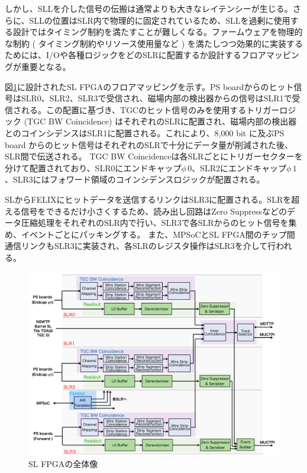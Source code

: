 しかし、SLLを介した信号の伝搬は通常よりも大きなレイテンシーが生じる。さらに、SLLの位置はSLR内で物理的に固定されているため、SLLを過剰に使用する設計ではタイミング制約を満たすことが難しくなる。ファームウェアを物理的な制約 ( タイミング制約やリソース使用量など ) を満たしつつ効果的に実装するためには、I/Oや各種ロジックをどのSLRに配置するか設計するフロアマッピングが重要となる。

図\ref{SL_floor}に設計されたSL FPGAのフロアマッピングを示す。PS boardからのヒット信号はSLR0、SLR2、SLR3で受信され、磁場内部の検出器からの信号はSLR1で受信される。この配置に基づき、TGCのヒット信号のみを使用するトリガーロジック (TGC BW Coincidence) はそれぞれのSLRに配置され、磁場内部の検出器とのコインシデンスはSLR1に配置される。これにより、8,000 bit に及ぶPS board からのヒット信号はそれぞれのSLRで十分にデータ量が削減された後、SLR間で伝送される。
TGC BW Coincidenceは各SLRごとにトリガーセクターを分けて配置されており、SLR0にエンドキャップ$\phi\,0$、SLR2にエンドキャップ$\phi\,1$、SLR3にはフォワード領域のコインシデンスロジックが配置される。

SLからFELIXにヒットデータを送信するリンクはSLR3に配置される。SLRを超える信号をできるだけ小さくするため、読み出し回路はZero Suppressなどのデータ圧縮処理をそれぞれのSLR内で行い、SLR3で各SLRからのヒット信号を集め、イベントごとにパッキングする。
また、MPSoCとSL FPGA間のチップ間通信リンクもSLR3に実装され、各SLRのレジスタ操作はSLR3を介して行われる。

\begin{figure} 
\centering
\includegraphics[width=16cm]{fig/Intro/SL_floor.png}
\caption[SL FPGA全体像]{SL FPGAの全体像}
\label{SL_floor}
\end{figure}



